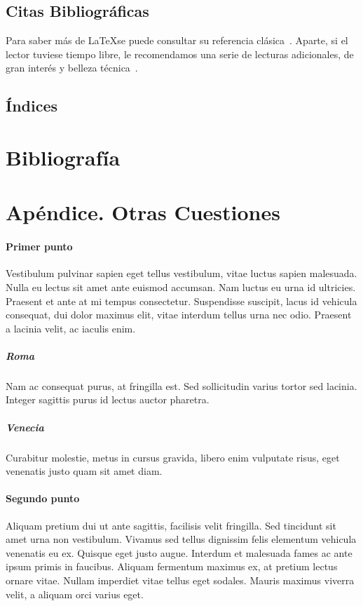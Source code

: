 \documentclass{article}
\begin{document}
\subsection{Citas Bibliográficas}

Para saber más de \LaTeX se puede consultar su referencia clásica~\cite{lamport:1994}. Aparte, si el lector tuviese tiempo libre, le recomendamos una serie de lecturas adicionales, de gran interés y belleza técnica~\cite{DelaVegaReview2019,DelaVegaQUATIC2018,DelaVegaSLATE2015,DelaVegaFLANDM2018,DelaVegaERFORUM2017}.

\subsection{Índices}

\section*{Bibliografía}





\section*{Apéndice. Otras Cuestiones}

\paragraph{Primer punto}

Vestibulum pulvinar sapien eget tellus vestibulum, vitae luctus sapien malesuada. Nulla eu lectus sit amet ante euismod accumsan. Nam luctus eu urna id ultricies. Praesent et ante at mi tempus consectetur. Suspendisse suscipit, lacus id vehicula consequat, dui dolor maximus elit, vitae interdum tellus urna nec odio. Praesent a lacinia velit, ac iaculis enim. \subparagraph {Roma} Nam ac consequat purus, at fringilla est. Sed sollicitudin varius tortor sed lacinia. Integer sagittis purus id lectus auctor pharetra. \subparagraph {Venecia} Curabitur molestie, metus in cursus gravida, libero enim vulputate risus, eget venenatis justo quam sit amet diam.

\paragraph{Segundo punto}

Aliquam pretium dui ut ante sagittis, facilisis velit fringilla. Sed tincidunt sit amet urna non vestibulum. Vivamus sed tellus dignissim felis elementum vehicula venenatis eu ex. Quisque eget justo augue. Interdum et malesuada fames ac ante ipsum primis in faucibus. Aliquam fermentum maximus ex, at pretium lectus ornare vitae. Nullam imperdiet vitae tellus eget sodales. Mauris maximus viverra velit, a aliquam orci varius eget.
\end{document}
